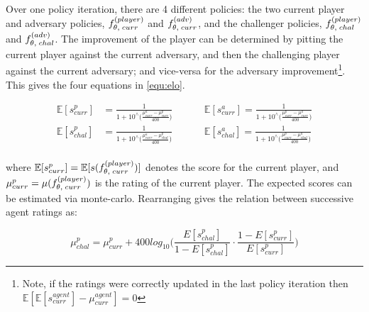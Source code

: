\documentclass[../main.tex]{subfiles}
\begin{document}
Over one policy iteration, there are 4 different policies: the two current player and adversary policies, $f_{\theta, \; curr}^{(player)}$ and $f_{\theta, \; curr}^{(adv)}$, and the challenger policies,  $f_{\theta, \; chal}^{(player)}$ and $f_{\theta, \; chal}^{(adv)}$. The improvement of the player can be determined by pitting the current player against the current adversary, and then the challenging player against the current adversary; and vice-versa for the adversary improvement\footnote{Note, if the ratings were correctly updated in the last policy iteration then $\mathbb{E}[\mathbb{E}[s_{curr}^{agent}] - \mu_{curr}^{agent}] = 0$}. This gives the four equations in \cref{equ:elo}.

\begin{align}
   \mathbb{E}[s^p_{curr}] &= \frac{1}{1+10^\wedge \big( \frac{\mu^a_{curr} - \mu^p_{curr}}{400} \big)} \hspace{1cm} &\mathbb{E}[s^a_{curr}] = \frac{1}{1+10^\wedge \big( \frac{\mu^p_{curr} - \mu^a_{curr}}{400} \big)}\\
   \mathbb{E}[s^p_{chal}] &= \frac{1}{1+10^\wedge \big( \frac{\mu^a_{curr} - \mu^p_{chal}}{400} \big)} \hspace{1cm} &\mathbb{E}[s^a_{chal}] = \frac{1}{1+10^\wedge \big( \frac{\mu^p_{curr} - \mu^a_{chal}}{400} \big)}\\
\end{align}

where $\mathbb{E}[s^p_{curr}] = \mathbb{E}[s(f_{\theta, \; curr}^{(player)})]$ denotes the score for the current player, and $\mu^p_{curr} = \mu(f_{\theta, \; curr}^{(player)})$ is the rating of the current player. The expected scores can be estimated via monte-carlo. Rearranging gives the relation between successive agent ratings as:

\begin{equation}
   \mu^p_{chal} = \mu^p_{curr} + 400log_{10} \bigg( \frac{{E}[s^p_{chal}]}{1 - {E}[s^p_{chal}]} \cdot \frac{1 - {E}[s^p_{curr}]}{{E}[s^p_{curr}]}    \bigg)
\end{equation}


\onlyinsubfile{\appendix}
\onlyinsubfile{}
\end{document}

